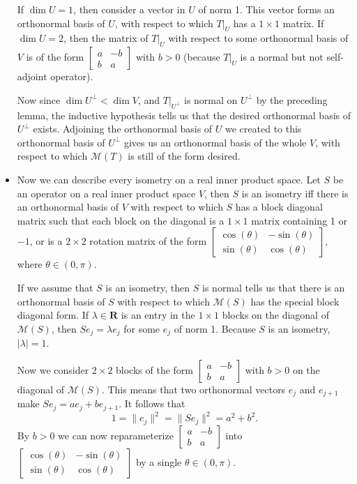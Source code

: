 \documentclass[11pt]{article}
\newcommand{\R}{\mathbf{R}}
\renewcommand{\d}{\dim}
\newcommand{\nm}[1]{\lVert #1 \rVert}
\newcommand{\abs}[1]{\lvert #1 \rvert}
\newcommand{\M}{\mathcal{M}}
\begin{document}
\begin{itemize}
    If $\d U = 1$, then consider a vector in $U$ of norm 1. This vector forms an orthonormal basis of $U$, with respect to which $T|_U$ has a $1\times1$ matrix. If $\d U = 2$, then the matrix of $T|_U$ with respect to some orthonormal basis of $V$ is of the form $\begin{bmatrix}
    a & -b \\ b & a
    \end{bmatrix}$ with $b>0$ (because $T|_U$ is a normal but not self-adjoint operator).
    
    Now since $\d U^\perp < \d V$, and $T|_{U^\perp}$ is normal on $U^\perp$ by the preceding lemma, the inductive hypothesis tells us that the desired orthonormal basis of $U^\perp$ exists. Adjoining the orthonormal basis of $U$ we created to this orthonormal basis of $U^\perp$ gives us an orthonormal basis of the whole $V$, with respect to which $\M(T)$ is still of the form desired.
    \item Now we can describe every isometry on a real inner product space. Let $S$ be an operator on a real inner product space $V$, then $S$ is an isometry iff there is an orthonormal basis of $V$ with respect to which $S$ has a block diagonal matrix such that each block on the diagonal is a $1\times1$ matrix containing 1 or $-1$, or is a $2\times2$ rotation matrix of the form $\begin{bmatrix}
    \cos(\theta) & -\sin(\theta) \\ \sin(\theta) & \cos(\theta)
    \end{bmatrix}$, where $\theta \in (0,\pi)$.

    If we assume that $S$ is an isometry, then $S$ is normal tells us that there is an orthonormal basis of $S$ with respect to which $\M(S)$ has the special block diagonal form. If $\lambda \in \R$ is an entry in the $1\times1$ blocks on the diagonal of $\M(S)$, then $Se_j = \lambda e_j$ for some $e_j$ of norm 1. Because $S$ is an isometry, $\abs{\lambda} = 1$.

    Now we consider $2\times2$ blocks of the form $\begin{bmatrix}
    a & -b \\ b & a
    \end{bmatrix}$ with $b>0$ on the diagonal of $\M(S)$. This means that two orthonormal vectors $e_j$ and $e_{j+1}$ make $Se_j = ae_j + be_{j+1}$. It follows that \[1 = \nm{e_j}^2 = \nm{Se_j}^2 = a^2 + b^2.\] By $b > 0$ we can now reparameterize $\begin{bmatrix}
    a & -b \\ b & a
    \end{bmatrix}$ into $\begin{bmatrix}
    \cos(\theta) & -\sin(\theta) \\ \sin(\theta) & \cos(\theta)
    \end{bmatrix}$ by a single $\theta \in (0,\pi)$.


\end{itemize}
\end{document}
